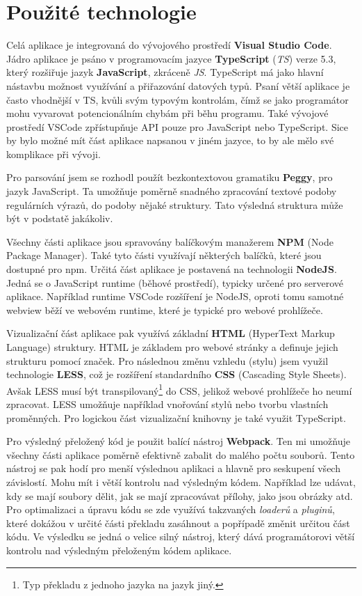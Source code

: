 \newpage

\section{Použité technologie}\label{sec:USEDtech}
Celá aplikace je integrovaná do vývojového prostředí \textbf{Visual Studio Code}\cite{Microsoft_2021a}. 
Jádro aplikace je psáno v programovacím jazyce \textbf{TypeScript}\cite{TypeScript} (\textit{TS}) verze 5.3, který rozšiřuje jazyk \textbf{JavaScript}, zkráceně \textit{JS}. 
TypeScript má jako hlavní nástavbu možnost využívání a přiřazování datových typů.
Psaní větší aplikace je často vhodnější v TS, kvůli svým typovým kontrolám, čímž se jako programátor mohu vyvarovat potencionálním chybám při běhu programu.
Také vývojové prostředí VSCode zpřístupňuje API pouze pro JavaScript nebo TypeScript.
Sice by bylo možné mít část aplikace napsanou v jiném jazyce, to by ale mělo své komplikace při vývoji.

Pro parsování jsem se rozhodl použít bezkontextovou gramatiku \textbf{Peggy}\cite{Peggy, Peggyjs}, pro jazyk JavaScript.
Ta umožňuje poměrně snadného zpracování textové podoby regulárních výrazů, do podoby nějaké struktury.
Tato výsledná struktura může být v podstatě jakákoliv.

Všechny části aplikace jsou spravovány balíčkovým manažerem \textbf{NPM}\cite{npm} (Node Package Manager).
Také tyto části využívají některých balíčků, které jsou dostupné pro npm. 
Určitá část aplikace je postavená na technologii \textbf{NodeJS}\cite{Node.js}.
Jedná se o JavaScript runtime (běhové prostředí), typicky určené pro serverové aplikace. 
Například runtime VSCode rozšíření je NodeJS, oproti tomu samotné webview běží ve webovém runtime, které je typické pro webové prohlížeče.

Vizualizační část aplikace pak využívá základní \textbf{HTML} (HyperText Markup Language) struktury.  
HTML je základem pro webové stránky a definuje jejich strukturu pomocí značek.
Pro následnou změnu vzhledu (stylu) jsem využil technologie \textbf{LESS}\cite{less}, což je rozšíření standardního \textbf{CSS} (Cascading Style Sheets).
Avšak LESS musí být transpilovaný\footnote{Typ překladu z jednoho jazyka na jazyk jiný.} do CSS, jelikož webové prohlížeče ho neumí zpracovat. 
LESS umožňuje například vnořování stylů nebo tvorbu vlastních proměnných.
Pro logickou část vizualizační knihovny je také využit TypeScript.

Pro výsledný přeložený kód je použit balící nástroj \textbf{Webpack}\cite{webpack}.
Ten mi umožňuje všechny části aplikace poměrně efektivně zabalit do malého počtu souborů. 
Tento nástroj se pak hodí pro menší výslednou aplikaci a hlavně pro seskupení všech závislostí.
Mohu mít i větší kontrolu nad výsledným kódem.
Například lze udávat, kdy se mají soubory dělit, jak se mají zpracovávat přílohy, jako jsou obrázky atd.
Pro optimalizaci a úpravu kódu se zde využívá takzvaných \textit{loaderů} a \textit{pluginů}, 
které dokážou v určité části překladu zasáhnout a popřípadě změnit určitou část kódu.
Ve výsledku se jedná o velice silný nástroj, který dává programátorovi větší kontrolu nad výsledným přeloženým kódem aplikace.

